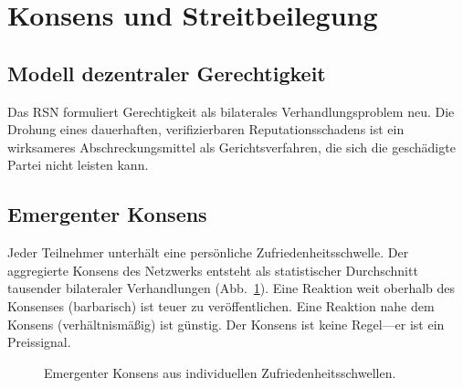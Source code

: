 \documentclass[11pt,a4paper,twocolumn]{article}
\begin{document}
\section{Konsens und Streitbeilegung}

\subsection{Modell dezentraler Gerechtigkeit}

Das RSN formuliert Gerechtigkeit als bilaterales Verhandlungsproblem neu. Die Drohung eines dauerhaften, verifizierbaren Reputationsschadens ist ein wirksameres Abschreckungsmittel als Gerichtsverfahren, die sich die geschädigte Partei nicht leisten kann.

\subsection{Emergenter Konsens}

Jeder Teilnehmer unterhält eine persönliche Zufriedenheitsschwelle. Der aggregierte Konsens des Netzwerks entsteht als statistischer Durchschnitt tausender bilateraler Verhandlungen (Abb.~\ref{fig:consensus}). Eine Reaktion weit oberhalb des Konsenses (barbarisch) ist teuer zu veröffentlichen. Eine Reaktion nahe dem Konsens (verhältnismäßig) ist günstig. Der Konsens ist keine Regel---er ist ein Preissignal.

\begin{figure}[ht]
\centering
{}
\caption{Emergenter Konsens aus individuellen Zufriedenheitsschwellen.}
\label{fig:consensus}
\end{figure}
\end{document}
